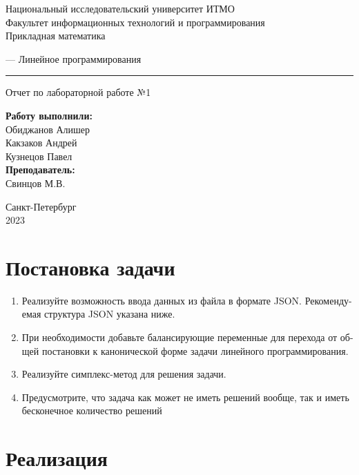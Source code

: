 \documentclass{article}
\begin{document}
\begin{center}
    Национальный исследовательский университет ИТМО\\
    Факультет информационных технологий и программирования\\
    Прикладная математика
\end{center}
\vspace{20em}
\begin{center}
    {\Large — Линейное программирования}
    \vspace{3pt}
    \hrule
    \vspace{3pt}
    Отчет по лабораторной работе №1
\end{center}
\vspace{20em}
\begin{flushright}
    \textbf{ Работу выполнили: } \\
    Обиджанов Алишер\\
    Какзаков Андрей\\
    Кузнецов Павел\\
    \vspace{1em}
    \textbf{ Преподаватель: } \\
    Свинцов М.В.
\end{flushright}
\vspace{12em}
\begin{center}
    Санкт-Петербург \\
    2023
\end{center}
\newpage

\section{Постановка задачи}
\begin{enumerate}
    \item Реализуйте возможность ввода данных из файла в формате JSON. Рекоменду-
          емая структура JSON указана ниже.
    \item При необходимости добавьте балансирующие переменные для перехода от об-
          щей постановки к канонической форме задачи линейного программирования.
    \item Реализуйте симплекс-метод для решения задачи.
    \item Предусмотрите, что задача как может не иметь решений вообще, так и иметь
          бесконечное количество решений
\end{enumerate}

\section{Реализация}
\end{document}
